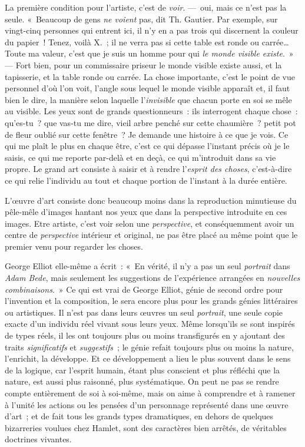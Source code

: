 \documentclass[french,twoside]{book} %
\begin{document}
La première condition pour l’artiste, c’est de \emph{voir}. — oui, mais ce n’est pas la seule. « Beaucoup de gens \emph{ne voient} pas, dit Th. Gautier. Par exemple, sur vingt-cinq personnes qui entrent ici, il n’y en a pas trois qui discernent la couleur du papier ! Tenez, voilà X. ; il ne verra pas si cette table est ronde ou carrée… Toute ma valeur, c’est que je suis un homme pour qui \emph{le monde visible existe}. » — Fort bien, pour un commissaire priseur le monde visible existe aussi, et la tapisserie, et la table ronde ou carrée. La chose importante, c’est le point de vue personnel d’où l’on voit, l’angle sous lequel le monde visible apparaît et, il faut bien le dire, la manière selon laquelle l’\emph{invisible} que chacun porte en soi se mêle au visible. Les yeux sont de grands questionneurs : ils interrogent chaque chose : qu’es-tu ? que vas-tu me dire, vieil arbre penché sur cette chaumière ? petit pot de fleur oublié sur cette fenêtre ? Je demande une histoire à ce que je vois. Ce qui me plaît le plus en chaque être, c’est ce qui dépasse l’instant précis où je le saisis, ce qui me reporte par-delà et en deçà, ce qui m’introduit dans sa vie propre. Le grand art consiste à saisir et à rendre l’\emph{esprit des choses}, c’est-à-dire ce qui relie l’individu au tout et chaque portion de l’instant à la durée entière.\par
L’œuvre d’art consiste donc beaucoup moins dans la reproduction minutieuse du pêle-mêle d’images hantant nos yeux que dans la perspective introduite en ces images. Etre artiste, c’est voir selon une \emph{perspective}, et conséquemment avoir un centre de \emph{perspective} intérieur et original, ne pas être placé au même point que le premier venu pour regarder les choses.\par
George Elliot elle-même a écrit : « En vérité, il n’y a pas un seul \emph{portrait} dans \emph{Adam Bede}, mais seulement les suggestions de l’expérience arrangées en \emph{nouvelles combinaisons}. » Ce qui est vrai de George Elliot, génie de second ordre pour l’invention et la composition, le sera encore plus pour les grands génies littéraires ou artistiques. Il n’est pas dans leurs œuvres un seul \emph{portrait}, une seule copie exacte d’un individu réel vivant sous leurs yeux. Même lorsqu’ils se sont inspirés de types réels, il les ont toujours plus ou moins transfigurés en y ajoutant des traits \emph{significatifs} et \emph{suggestifs} ; le génie refait toujours plus ou moins la nature, l’enrichit, la développe. Et ce développement a lieu le plus souvent dans le sens de la logique, car l’esprit humain, étant plus conscient et plus réfléchi que la nature, est aussi plus raisonné, plus systématique. On peut ne pas se rendre compte entièrement de soi à soi-même, mais on aime à comprendre et à ramener à l’unité les actions ou les pensées d’un personnage représenté dans une œuvre d’art ; et de fait tous les grands types dramatiques, en dehors de quelques bizarreries voulues chez Hamlet, sont des caractères bien arrêtés, de véritables doctrines vivantes.\par
\end{document}
